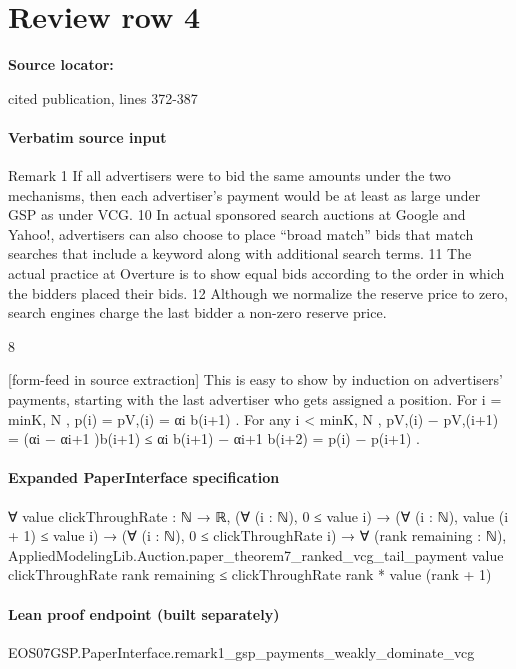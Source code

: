 \documentclass[10pt]{article}
\begin{document}
\section*{Review row 4}
\textbf{Source locator:} {\footnotesize\raggedright cited publication, lines 372-\allowbreak{}387\par}
\paragraph{Verbatim source input}
\begin{ReviewVerbatim}
Remark 1 If all advertisers were to bid the same amounts under the two mechanisms, then each
advertiser’s payment would be at least as large under GSP as under VCG.
10
In actual sponsored search auctions at Google and Yahoo!, advertisers can also choose to place “broad match”
bids that match searches that include a keyword along with additional search terms.
11
The actual practice at Overture is to show equal bids according to the order in which the bidders placed their
bids.
12
Although we normalize the reserve price to zero, search engines charge the last bidder a non-zero reserve price.

8


[form-feed in source extraction]
This is easy to show by induction on advertisers’ payments, starting with the last advertiser
who gets assigned a position. For i = min{K, N }, p(i) = pV,(i) = αi b(i+1) . For any i < min{K, N },
pV,(i) − pV,(i+1) = (αi − αi+1 )b(i+1) ≤ αi b(i+1) − αi+1 b(i+2) = p(i) − p(i+1) .
\end{ReviewVerbatim}



\paragraph{Expanded PaperInterface specification}
\begin{ReviewVerbatim}
∀ {value clickThroughRate : ℕ → ℝ},
  (∀ (i : ℕ), 0 ≤ value i) →
    (∀ (i : ℕ), value (i + 1) ≤ value i) →
      (∀ (i : ℕ), 0 ≤ clickThroughRate i) →
        ∀ (rank remaining : ℕ),
          AppliedModelingLib.Auction.paper_theorem7_ranked_vcg_tail_payment value clickThroughRate rank remaining ≤
            clickThroughRate rank * value (rank + 1)
\end{ReviewVerbatim}



\paragraph{Lean proof endpoint (built separately)}\begin{ReviewVerbatim}
EOS07GSP.PaperInterface.remark1_gsp_payments_weakly_dominate_vcg
\end{ReviewVerbatim}
\end{document}
